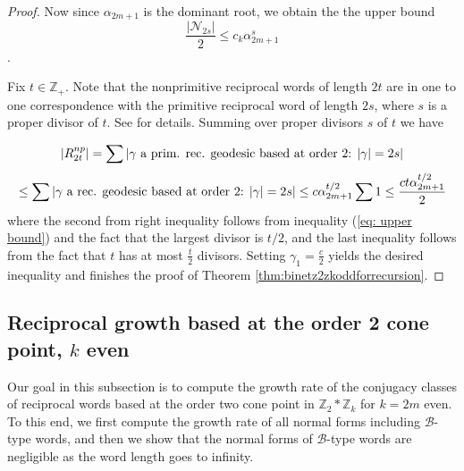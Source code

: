 \documentclass[11pt]{amsart}
\numberwithin{equation}{section}
\theoremstyle{plain}
\begin{document}
\begin{proof}
Now since $\alpha_{2m+1}$ is the dominant root, we obtain the  the upper bound
 \begin{equation}\label{eq: upper bound}
 \frac{|\mathcal{N}_{2s}| }{2}\leq c_{k} \alpha_{2m+1}^{s}
 \end{equation}.
 
Fix $t \in \mathbb{Z}_{+}$. Note that  the  nonprimitive reciprocal words  of length   $2t$ are in one to one correspondence  with the primitive reciprocal word of length $2s$, where $s$ is a proper divisor of  $t$. 
See \cite{BasSuz}  for  details. Summing over proper divisors $s$ of $t$ we have
  	
  	\begin{equation*} \label{nonprims computation1 Z2Zk}
  	|R_{2t}^{np}| = 
\sum |\text{$ \gamma$ a prim. rec. geodesic based at order 2: $|\gamma|=2s$}| 
\end{equation*}
\begin{equation*}
\leq \sum |\text{$ \gamma$ a  rec. geodesic based at order 2: $|\gamma|=2s$}|  
\leq c  \alpha_{2m+1}^{t/2} \sum 1 \leq \frac{ct \alpha_{2m+1}^{t/2}}{2} 
  \end{equation*}
where the second from right inequality follows from  inequality 
(\ref{eq: upper bound}) and the fact that the largest divisor is $t/2$, and the last inequality follows from the fact that $t$ has at most 
$\frac{t}{2}$ divisors. Setting  $\gamma_{1}=\frac{c}{2}$  yields  the desired inequality and finishes the proof of Theorem \ref{thm:binetz2zkoddforrecursion}.
\end{proof}	
  
    
  
  


  
 \subsection{Reciprocal growth based at the order 2 cone point, $k$ even}
 Our goal in this subsection is to compute the growth rate of the  conjugacy classes of reciprocal words  based at the order two cone point in $\mathbb{Z}_{2} * \mathbb{Z}_{k}$ for 
 $k=2m$ even. To this end,
 we first compute the growth  rate of all normal forms including $\mathcal{B}$-type words, and then  we  show   that the normal forms of $\mathcal{B}$-type words are negligible  as the  word  length goes to infinity. 
\end{document}
